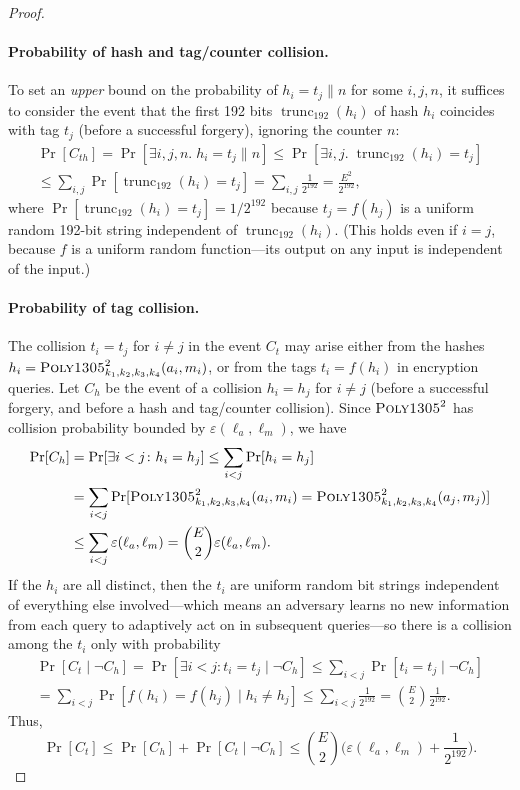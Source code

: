 \documentclass[draft]{article}
\DeclareRobustCommand{\operatorsc}[1]{{%
  \ifmmode\let\next=\operatorname\else\let\next=\relax\fi\next{\textsc{#1}}}}
\def\Poly#1/{\operatorsc{Poly#1}}
\DeclareMathOperator{\trunc}{trunc}
\newcommand{\concat}{\mathbin\|}
\newcommand{\given}{\mathrel|}
\newcommand{\collisionbound}{\varepsilon}
\begin{document}
\begin{proof}
\paragraph*{Probability of hash and tag/counter collision.}
To set an \emph{upper} bound on the probability of
 $h_i = t_j \concat n$ for some $i,j,n$,
 it suffices to consider the event that the first 192 bits
 $\trunc_{192}(h_i)$
 of hash $h_i$ coincides with tag $t_j$
 (before a successful forgery),
 ignoring the counter $n$:
%
\begin{multline*}
  \Pr[C_{th}]
   = \Pr[\exists i,j,n.\; h_i = t_j \concat n]
   \leq \Pr[\exists i,j.\; \trunc_{192}(h_i) = t_j] \\
   \leq \sum_{i,j} \Pr[\trunc_{192}(h_i) = t_j]
   = \sum_{i,j} \frac{1}{2^{192}}
   = \frac{E^2}{2^{192}},
\end{multline*}
%
 where
 $\Pr[\trunc_{192}(h_i) = t_j] = 1/2^{192}$
 because $t_j = f(h_j)$ is a uniform random 192-bit string
 independent of $\trunc_{192}(h_i)$.
(This holds even if $i = j$, because $f$ is a uniform random
 function---its output on any input is independent of the input.)

\paragraph*{Probability of tag collision.}
The collision $t_i = t_j$ for $i \ne j$ in the event $C_t$ may arise
 either from the hashes
 $h_i = \Poly1305/^2_{k_1,k_2,k_3,k_4}(a_i, m_i)$,
 or from the tags
 $t_i = f(h_i)$
 in encryption queries.
Let $C_h$ be the event of a collision $h_i = h_j$ for $i \ne j$
 (before a successful forgery, and before a hash and tag/counter
 collision).
Since $\Poly1305/^2$ has collision probability bounded by
 $\collisionbound(\ell_a, \ell_m)$,
 we have
%
\begin{align*}
  \Pr[C_h]
    &= \Pr[\exists i<j\colon h_i = h_j]
     \leq \sum_{i<j} \Pr[h_i = h_j] \\
    &= \sum_{i<j}
         \Pr[\Poly1305/^2_{k_1,k_2,k_3,k_4}(a_i, m_i)
               = \Poly1305/^2_{k_1,k_2,k_3,k_4}(a_j, m_j)] \\
    &\leq \sum_{i<j} \collisionbound(\ell_a, \ell_m)
     = \binom{E}{2} \collisionbound(\ell_a, \ell_m).
\end{align*}
%
If the $h_i$ are all distinct, then the $t_i$ are uniform random bit
 strings independent of everything else involved---which means an
 adversary learns no new information from each query to adaptively act
 on in subsequent queries---so there is a collision among the $t_i$
 only with probability
%
\begin{multline*}
  \Pr[C_t \given \lnot C_h]
     = \Pr[\exists i<j\colon t_i = t_j \given \lnot C_h]
     \leq \sum_{i<j} \Pr[t_i = t_j \given \lnot C_h] \\
     = \sum_{i<j} \Pr[f(h_i) = f(h_j) \given h_i \ne h_j]
     \leq \sum_{i<j} \frac{1}{2^{192}}
     = \binom{E}{2} \frac{1}{2^{192}}.
\end{multline*}
%
Thus,
\[
  \Pr[C_t] \leq \Pr[C_h] + \Pr[C_t \given \lnot C_h]
    \leq \binom{E}{2} \biggl(
        \collisionbound(\ell_a, \ell_m)
        + \frac{1}{2^{192}}
      \biggr).
\]


\end{proof}
\end{document}
